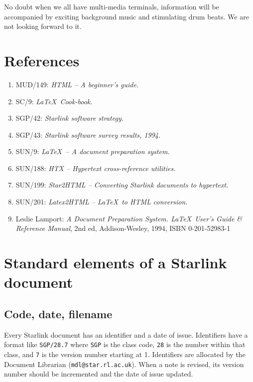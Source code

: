 \documentclass[twoside,11pt]{article}
\newcommand{\xref}[3]{#1}
\begin{document}
No doubt when we all have multi-media terminals, information will be
accompanied by exciting background music and stimulating drum beats.
We are not looking forward to it.

\section{References}

\begin{enumerate}
\item MUD/149: {\em HTML -- A beginner's guide.}
\item \xref{SC/9}{sc9}{}: {\em \LaTeX\ Cook-book.}
\item \xref{SGP/42}{sgp42}{}: {\em Starlink software strategy.}
\item SGP/43: {\em Starlink software survey results, 1994.}
\item \xref{SUN/9}{sun9}{}: {\em \LaTeX\ -- A document preparation system.}
\item \xref{SUN/188}{sun188}{}: {\em HTX -- Hypertext cross-reference utilities.}
\item \xref{SUN/199}{sun199}{}: {\em Star2HTML -- Converting Starlink documents
  to hypertext.}
\item \xref{SUN/201}{sun201}{}: {\em Latex2HTML -- \LaTeX\ to HTML conversion.}
\item Leslie Lamport: {\em A Document Preparation System. \LaTeX\ User's
Guide \& Reference Manual}, 2nd ed, Addison-Wesley, 1994,
ISBN 0-201-52983-1
\end{enumerate}

\appendix

\newpage

\section{Standard elements of a Starlink document}

\subsection{Code, date, filename}

Every Starlink document has an identifier and a date of issue.
Identifiers have a format like {\tt SGP/28.7} where {\tt SGP} is the class code,
{\tt 28} is the number within that class, and {\tt 7} is the version number
starting at 1.
Identifiers are allocated by the Document Librarian
({\tt mdl@star.rl.ac.uk}).
When a note is revised, its version number should be incremented and the
date of issue updated.
\end{document}
